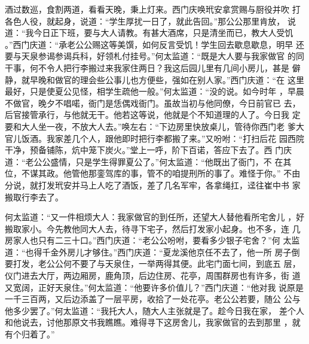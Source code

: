 酒过数巡，食割两道，看看天晚，秉上灯来。西门庆唤玳安拿赏赐与厨役并吹
打各色人役，就起身，说道：“学生厚扰一日了，就此告回。”那公公那里肯放，
说道：“我今日正下班，要与大人请教。有甚大酒席，只是清坐而已，教大人受饥
。”西门庆道：“承老公公赐这等美馔，如何反言受饥！学生回去歇息歇息，明早
还要与天泉参谒参谒兵科，好领札付挂号。”何太监道：“既是大人要与我家做官
的同干事，何不令人把行李搬过来我家住两日？我这后园儿里有几间小房儿，甚是
僻静，就早晚和做官的理会些公事儿也方便些，强如在别人家。”西门庆道：“在
这里最好，只是使夏公见怪，相学生疏他一般。”何太监道：“没的说。如今时年
，早晨不做官，晚夕不唱喏，衙门是恁偶戏衙门。虽故当初与他同僚，今日前官已
去，后官接管承行，与他就无干。他若这等说，他就是个不知道理的人了。今日我
定要和大人坐一夜，不放大人去。”唤左右：“下边房里快放桌儿，管待你西门老
爹大官儿饭酒。我家差几个人，跟他即时把行李都搬了来。”又吩咐：“打扫后花
园西院干净，预备铺陈，炕中笼下炭火。”堂上一呼，阶下百诺，答应下去了。西
门庆道：“老公公盛情，只是学生得罪夏公了。”何太监道：“他既出了衙门，不
在其位，不谋其政。他管他那銮驾库的事，管不的咱提刑所的事了。难怪于你。”
不由分说，就打发玳安并马上人吃了酒饭，差了几名军牢，各拿绳扛，迳往崔中书
家搬取行李去了。

何太监道：“又一件相烦大人：我家做官的到任所，还望大人替他看所宅舍儿
，好搬取家小。今先教他同大人去，待寻下宅子，然后打发家小起身。也不多，连
几房家人也只有二三十口。”西门庆道：“老公公吩咐，要看多少银子宅舍？”何
太监道：“也得千金外房儿才够住。”西门庆道：“夏龙溪他京任不去了，他一所
房子倒要打发，老公公何不要了与天泉住，一举两得其便。此宅门面七间，到底五
层，仪门进去大厅，两边厢房，鹿角顶，后边住房、花亭，周围群房也有许多，街
道又宽阔，正好天泉住。”何太监道：“他要许多价值儿？”西门庆道：“他对我
说原是一千三百两，又后边添盖了一层平房，收拾了一处花亭。老公公若要，随公
公与他多少罢了。”何太监道：“我托大人，随大人主张就是了。趁今日我在家，
差个人和他说去，讨他那原文书我瞧瞧。难得寻下这房舍儿，我家做官的去到那里
，就有个归着了。”


